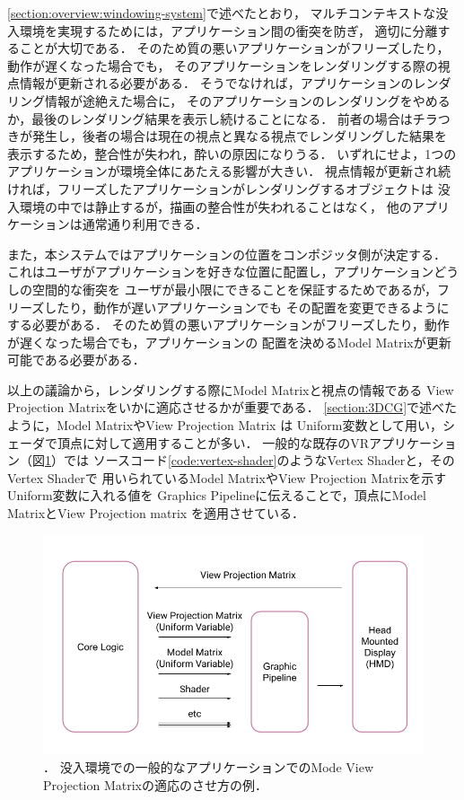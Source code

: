 \ref{section:overview:windowing-system}で述べたとおり，
マルチコンテキストな没入環境を実現するためには，アプリケーション間の衝突を防ぎ，
適切に分離することが大切である．
そのため質の悪いアプリケーションがフリーズしたり，動作が遅くなった場合でも，
そのアプリケーションをレンダリングする際の視点情報が更新される必要がある．
そうでなければ，アプリケーションのレンダリング情報が途絶えた場合に，
そのアプリケーションのレンダリングをやめるか，最後のレンダリング結果を表示し続けることになる．
前者の場合はチラつきが発生し，後者の場合は現在の視点と異なる視点でレンダリングした結果を
表示するため，整合性が失われ，酔いの原因になりうる．
いずれにせよ，1つのアプリケーションが環境全体にあたえる影響が大きい．
視点情報が更新され続ければ，フリーズしたアプリケーションがレンダリングするオブジェクトは
没入環境の中では静止するが，描画の整合性が失われることはなく，
他のアプリケーションは通常通り利用できる．

また，本システムではアプリケーションの位置をコンポジッタ側が決定する．
これはユーザがアプリケーションを好きな位置に配置し，アプリケーションどうしの空間的な衝突を
ユーザが最小限にできることを保証するためであるが，フリーズしたり，動作が遅いアプリケーションでも
その配置を変更できるようにする必要がある．
そのため質の悪いアプリケーションがフリーズしたり，動作が遅くなった場合でも，アプリケーションの
配置を決めるModel Matrixが更新可能である必要がある．

以上の議論から，レンダリングする際にModel Matrixと視点の情報である
View Projection Matrixをいかに適応させるかが重要である．
\ref{section:3DCG}で述べたように，Model MatrixやView Projection Matrix は
Uniform変数として用い，シェーダで頂点に対して適用することが多い．
一般的な既存のVRアプリケーション（図\ref{fig:app-mvp}）では
ソースコード\ref{code:vertex-shader}のようなVertex Shaderと，そのVertex Shaderで
用いられているModel MatrixやView Projection Matrixを示すUniform変数に入れる値を
Graphics Pipelineに伝えることで，頂点にModel MatrixとView Projection matrix
を適用させている．

\begin{figure}[htbp]
  \centering
  \includegraphics[keepaspectratio, width=1\linewidth]{figures/app-mvp.png}
  \caption{．
    没入環境での一般的なアプリケーションでのMode View Projection Matrixの適応のさせ方の例．
  }
  \label{fig:app-mvp}
\end{figure}

